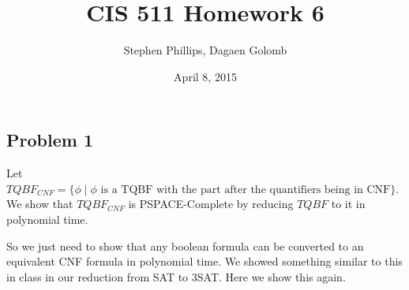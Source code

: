 \documentclass[english]{article}
\title{CIS 511 Homework 6}
\author{Stephen Phillips, Dagaen Golomb}
\date{April 8, 2015}
\begin{document}
\maketitle
\subsection*{Problem 1}
Let $TQBF_{CNF} = \{ \phi \mid \phi \textrm{ is a TQBF with the part after the quantifiers being in CNF} \}$. We show
that $TQBF_{CNF}$ is PSPACE-Complete by reducing $TQBF$ to it in polynomial time.


So we just need to show that any boolean formula can be converted to an equivalent CNF formula in polynomial time.
We showed something similar to this in class in our reduction from SAT to 3SAT. Here we show this again.
\end{document}
